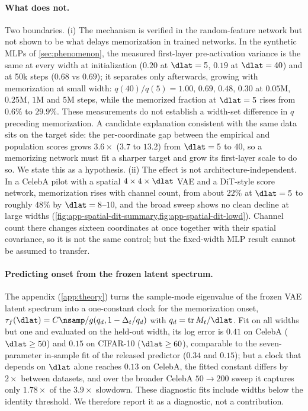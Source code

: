 \paragraph{What does not.}
Two boundaries. (i) The mechanism is verified in the random-feature network but not shown to be what delays memorization in trained networks. In the synthetic MLPs of \cref{sec:phenomenon}, the measured first-layer pre-activation variance is the same at every width at initialization ($0.20$ at $\dlat=5$, $0.19$ at $\dlat=40$) and at 50k steps ($0.68$ vs $0.69$); it separates only afterwards, growing with memorization at small width: $q(40)/q(5)=1.00,\,0.69,\,0.48,\,0.30$ at $0.05$M, $0.25$M, $1$M and $5$M steps, while the memorized fraction at $\dlat=5$ rises from $0.6\%$ to $29.9\%$. These measurements do not establish a width-set difference in $q$ preceding memorization. A candidate explanation consistent with the same data sits on the target side: the per-coordinate gap between the empirical and population scores grows $3.6\times$ ($3.7$ to $13.2$) from $\dlat=5$ to $40$, so a memorizing network must fit a sharper target and grow its first-layer scale to do so. We state this as a hypothesis. (ii) The effect is not architecture-independent. In a CelebA pilot with a spatial $4\times4\times\dlat$ VAE and a DiT-style score network, memorization rises with channel count, from about $22\%$ at $\dlat=5$ to roughly $48\%$ by $\dlat=8$--$10$, and the broad sweep shows no clean decline at large widths (\cref{fig:app-spatial-dit-summary,fig:app-spatial-dit-lowd}). Channel count there changes sixteen coordinates at once together with their spatial covariance, so it is not the same control; but the fixed-width MLP result cannot be assumed to transfer.

\paragraph{Predicting onset from the frozen latent spectrum.}\label{sec:predictor}
The appendix (\cref{app:theory}) turns the sample-mode eigenvalue of the frozen VAE latent spectrum into a one-constant clock for the memorization onset, $\tau_f(\dlat)=C\nsamp/g(q_d,1-\Delta_t/q_d)$ with $q_d=\operatorname{tr}M_t/\dlat$. Fit on all widths but one and evaluated on the held-out width, its log error is $0.41$ on CelebA ($\dlat\ge50$) and $0.15$ on CIFAR-10 ($\dlat\ge60$), comparable to the seven-parameter in-sample fit of the released predictor ($0.34$ and $0.15$); but a clock that depends on $\dlat$ alone reaches $0.13$ on CelebA, the fitted constant differs by $2\times$ between datasets, and over the broader CelebA $50\to200$ sweep it captures only $1.78\times$ of the $3.9\times$ slowdown. These diagnostic fits include widths below the identity threshold. We therefore report it as a diagnostic, not a contribution.
